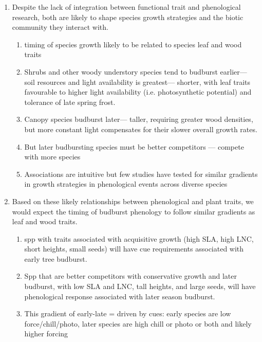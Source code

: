 \documentclass{article}
\begin{document}
\begin{enumerate}
\item Despite the lack of integration between functional trait and phenological research, both are likely to shape species growth strategies and the biotic community they interact with.
\begin{enumerate}
\item timing of species growth likely to be related to species leaf and wood traits 
\item Shrubs and other woody understory species tend to budburst earlier--- soil resources and light availability is greatest--- shorter, with leaf traits favourable to higher light availability (i.e. photosynthetic potential) and tolerance of late spring frost.
\item Canopy species budburst later--- taller, requiring greater wood densities, but more constant light compensates for their slower overall growth rates.
\item But later budbursting species must be better competitors --- compete with more species
\item Associations are intuitive but few studies have tested for similar gradients in growth strategies in phenological events across diverse species
\end{enumerate}


\item Based on these likely relationships between phenological and plant traits, we would expect the timing of budburst phenology to follow similar gradients as leaf and wood traits.
\begin{enumerate}
\item spp with traits associated with acquisitive growth (high SLA, high LNC, short heights, small seeds) will have cue requirements associated with early tree budburst. %
\item Spp that are better competitors with conservative growth and later budburst, with low SLA and LNC, tall heights, and large seeds, will have phenological response associated with later season budburst. %
\item This gradient of early-late = driven by cues: early species are low force/chill/photo, later species are high chill or photo or both and likely higher forcing %
\end{enumerate}


\end{enumerate}
\end{document}
